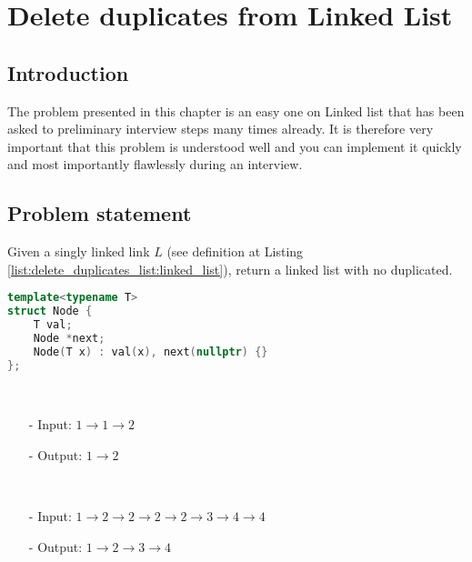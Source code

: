 %

\chapter{Delete duplicates from Linked List}
\label{ch:delete_duplicates_list}
\section*{Introduction}
The problem presented in this chapter is an easy one on Linked list that has been asked to preliminary interview steps many times already. It is therefore very important that this problem is understood well and you can implement it quickly and most importantly flawlessly during an interview. 
\section{Problem statement}
\begin{exercise}
Given a singly linked link $L$ (see definition at Listing \ref{list:delete_duplicates_list:linked_list}), return a linked list with no duplicated.
\end{exercise}
\begin{lstlisting}[language=c++, caption=Singly Linked list definition,label=list:delete_duplicates_list:linked_list]
template<typename T>
struct Node {
    T val;
    Node *next;
    Node(T x) : val(x), next(nullptr) {}
};
\end{lstlisting}

\begin{example}
	\hfill \\
	\begin{itemize}
		\item[-] Input: $1 \rightarrow 1 \rightarrow 2$
		\item[-] Output: $1 \rightarrow 2$
	\end{itemize}
\end{example}

\begin{example}
	\hfill \\
	\begin{itemize}
		\item[-] Input: $1 \rightarrow  2 \rightarrow  2 \rightarrow  2 \rightarrow  2 \rightarrow  3 \rightarrow  4 \rightarrow  4 $
		\item[-] Output: $1 \rightarrow  2 \rightarrow 3 \rightarrow  4$
	\end{itemize}
\end{example}

